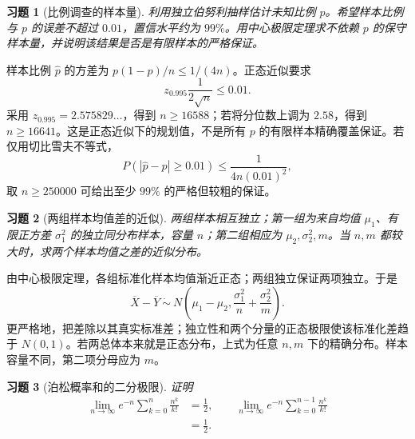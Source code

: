 \documentclass[12pt,fontset=fandol]{ctexart}
\newtheorem{exercise}{习题}[section]
\begin{document}
\begin{exercise}[比例调查的样本量]\label{q:A7.14}
利用独立伯努利抽样估计未知比例 $p$。希望样本比例与 $p$ 的误差不超过 $0.01$，置信水平约为 $99\%$。用中心极限定理求不依赖 $p$ 的保守样本量，并说明该结果是否是有限样本的严格保证。\par{}
\end{exercise}

\begin{solve}\label{a:A7.14}样本比例 $\widehat p$ 的方差为 $p(1-p)/n\le1/(4n)$。正态近似要求\[z_{0.995}\frac{1}{2\sqrt n}\le0.01.\]采用 $z_{0.995}=2.575829\ldots$，得到 $n\ge16588$；若将分位数上调为 $2.58$，得到 $n\ge16641$。这是正态近似下的规划值，不是所有 $p$ 的有限样本精确覆盖保证。若仅用切比雪夫不等式，\[P(|\widehat p-p|\ge0.01)\le\frac{1}{4n(0.01)^2},\]取 $n\ge250000$ 可给出至少 $99\%$ 的严格但较粗的保证。\end{solve}

\begin{exercise}[两组样本均值差的近似]\label{q:A7.15}
两组样本相互独立；第一组为来自均值 $\mu_1$、有限正方差 $\sigma_1^2$ 的独立同分布样本，容量 $n$；第二组相应为 $\mu_2,\sigma_2^2,m$。当 $n,m$ 都较大时，求两个样本均值之差的近似分布。\par{}
\end{exercise}

\begin{solve}\label{a:A7.15}由中心极限定理，各组标准化样本均值渐近正态；两组独立保证两项独立。于是\[\overline X-\overline Y\ \dot\sim\ N\left(\mu_1-\mu_2,\frac{\sigma_1^2}{n}+\frac{\sigma_2^2}{m}\right).\]更严格地，把差除以其真实标准差；独立性和两个分量的正态极限使该标准化差趋于 $N(0,1)$。若两总体本来就是正态分布，上式为任意 $n,m$ 下的精确分布。样本容量不同，第二项分母应为 $m$。\end{solve}

\begin{exercise}[泊松概率和的二分极限]\label{q:A7.20}
证明\[\begin{aligned}\lim_{n\to\infty}e^{-n}\sum_{k=0}^{n}\frac{n^k}{k!}&=\frac12,\qquad\lim_{n\to\infty}e^{-n}\sum_{k=0}^{n-1}\frac{n^k}{k!}\\&=\frac12.\end{aligned}\]\par{}
\end{exercise}
\end{document}
